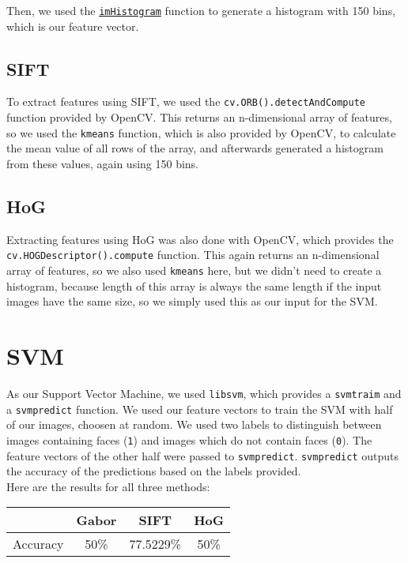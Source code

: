 \documentclass{article}
\begin{document}
  Then, we used the \href{http://www.mathworks.com/matlabcentral/fileexchange/28681-imhistogram/content/imHistogram.m}{\texttt{imHistogram}} function to generate a histogram with 150 bins, which is our feature vector.


  \subsection{SIFT}

  To extract features using SIFT, we used the \texttt{cv.ORB().detectAndCompute} function provided by OpenCV. This returns an n-dimensional array of features, so we used the \texttt{kmeans} function, which is also provided by OpenCV, to calculate the mean value of all rows of the array, and afterwards generated a histogram from these values, again using 150 bins.

  \subsection{HoG}

  Extracting features using HoG was also done with OpenCV, which provides the \texttt{cv.HOGDescriptor().compute} function. This again returns an n-dimensional array of features, so we also used \texttt{kmeans} here, but we didn't need to create a histogram, because length of this array is always the same length if the input images have the same size, so we simply used this as our input for the SVM.

  \newpage

  \section{SVM}

  As our Support Vector Machine, we used \texttt{libsvm}, which provides a \texttt{svmtraim} and a \texttt{svmpredict} function. We used our feature vectors to train the SVM with half of our images, choosen at random. We used two labels to distinguish between images containing faces (\texttt{1}) and images which do not contain faces (\texttt{0}). The feature vectors of the other half were passed to \texttt{svmpredict}. \texttt{svmpredict} outputs the accuracy of the predictions based on the labels provided.
  \\
  Here are the results for all three methods:
  \\
  \begin{center}
    \begin{tabular}{|l|c|c|c|}
      \hline
       & \textbf{Gabor} & \textbf{SIFT} & \textbf{HoG} \\
       \hline
       Accuracy & 50\% & 77.5229\% & 50\% \\
      \hline
    \end{tabular}
  \end{center}
\end{document}
